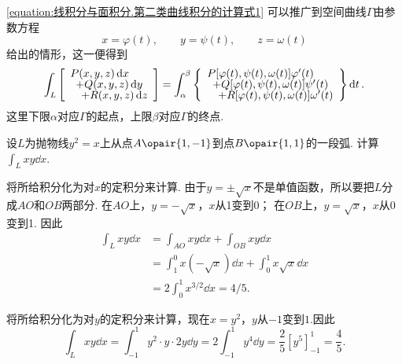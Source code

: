 \cref{equation:线积分与面积分.第二类曲线积分的计算式1} 可以推广到空间曲线\(\Gamma\)由参数方程\[
x=\varphi(t), \qquad
y=\psi(t), \qquad
z=\omega(t)
\]给出的情形，这一便得到
\begin{equation}\label{equation:线积分与面积分.第二类曲线积分的计算式2}
\int_L \left[ \def\arraystretch{.7}\begin{array}{l}
	P(x,y,z)\dd{x} \\
	\hspace{5pt}+ Q(x,y,z)\dd{y} \\
	\hspace{10pt}+ R(x,y,z)\dd{z}
\end{array} \right]
= \int_{\alpha}^{\beta} \left\{\def\arraystretch{.7}\begin{array}{l}
P[\varphi(t),\psi(t),\omega(t)] \varphi'(t) \\
\hspace{5pt}+ Q[\varphi(t),\psi(t),\omega(t)] \psi'(t) \\
\hspace{10pt}+ R[\varphi(t),\psi(t),\omega(t)] \omega'(t)
\end{array} \right\} \dd{t}.
\end{equation}
这里下限\(\alpha\)对应\(\Gamma\)的起点，上限\(\beta\)对应\(\Gamma\)的终点.

\begin{example}
设\(L\)为抛物线\(y^2 = x\)上从点\(A\opair{1,-1}\)到点\(B\opair{1,1}\)的一段弧.
计算\(\int_L xy \dd{x}\).
\begin{solution}[解法一]
将所给积分化为对\(x\)的定积分来计算.
由于\(y = \pm\sqrt{x}\)不是单值函数，所以要把\(L\)分成\(AO\)和\(OB\)两部分.
在\(AO\)上，\(y=-\sqrt{x}\)，\(x\)从1变到0；
在\(OB\)上，\(y=\sqrt{x}\)，\(x\)从0变到1.
因此\begin{align*}
\int_L xy \dd{x} &= \int_{AO} xy \dd{x} + \int_{OB} xy \dd{x} \\
&= \int_1^0 x(-\sqrt{x}) \dd{x} + \int_0^1 x\sqrt{x} \dd{x} \\
&= 2\int_0^1 x^{3/2} \dd{x} = 4/5.
\end{align*}
\end{solution}
\begin{solution}[解法二]
将所给积分化为对\(y\)的定积分来计算，现在\(x=y^2\)，\(y\)从\(-1\)变到\(1\).因此\[
\int_L xy \dd{x}
= \int_{-1}^1 y^2 \cdot y \cdot 2y \dd{y}
= 2\int_{-1}^1 y^4 \dd{y}
= \frac{2}{5} [y^5]_{-1}^1
= \frac{4}{5}.
\]
\end{solution}
\end{example}

